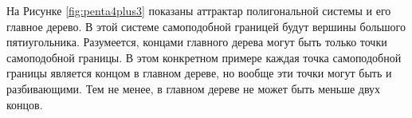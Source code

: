 На Рисунке \ref{fig:penta4plus3} показаны аттрактар полигональной системы и его главное дерево. 
В этой системе самоподобной границей будут вершины большого пятиугольника.
Разумеется, концами главного дерева могут быть только точки самоподобной границы.
В этом конкретном примере каждая точка самоподобной границы является концом в главном дереве, но вообще эти точки могут быть и разбивающими.
Тем не менее, в главном дереве не может быть меньше двух концов.

